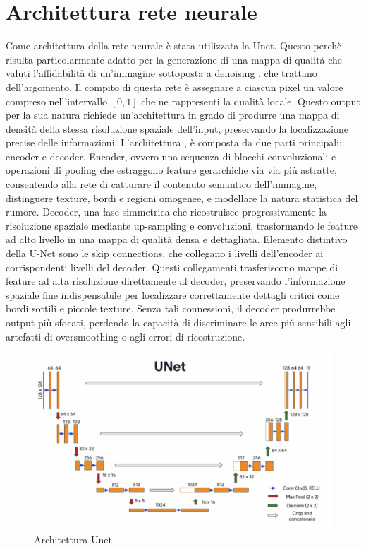 \section{Architettura rete neurale}
Come architettura della rete neurale è stata utilizzata la Unet. Questo perchè risulta particolarmente adatto per la 
generazione di una mappa di qualità che valuti l'affidabilità di un'immagine sottoposta a denoising \cite{Vyver2025}. che trattano dell'argomento. Il compito di 
questa rete è assegnare a ciascun pixel un valore compreso nell'intervallo $[0,1]$ che ne rappresenti la 
qualità locale. Questo output per la sua natura richiede un'architettura in grado di produrre una mappa di densità 
della stessa risoluzione spaziale dell'input, preservando la localizzazione precise delle informazioni. 
L'architettura \cite{ronneberger2015unetconvolutionalnetworksbiomedical}, è composta da due parti principali: encoder e decoder. 
Encoder, ovvero una sequenza di blocchi convoluzionali e operazioni di pooling che estraggono feature 
gerarchiche via via più astratte, consentendo alla rete di catturare il contenuto semantico dell’immagine, 
distinguere texture, bordi e regioni omogenee, e modellare la natura statistica del rumore.
Decoder, una fase simmetrica che ricostruisce progressivamente la risoluzione spaziale 
mediante up-sampling e convoluzioni, trasformando le feature ad alto livello in una mappa di 
qualità densa e dettagliata.
Elemento distintivo della U-Net sono le skip connections, che collegano i livelli dell’encoder ai corrispondenti 
livelli del decoder. Questi collegamenti trasferiscono mappe di feature ad alta risoluzione direttamente al decoder, 
preservando l’informazione spaziale fine indispensabile per localizzare correttamente dettagli critici come bordi 
sottili e piccole texture. Senza tali connessioni, il decoder produrrebbe output più sfocati, perdendo la capacità 
di discriminare le aree più sensibili agli artefatti di oversmoothing o agli errori di ricostruzione.
\begin{figure}[H]
  \centering
  \includegraphics[width=\textwidth]{utils/unet.png}
  \caption{Architettura Unet}
  \label{fig:ArchitetturaUnet}
\end{figure}


